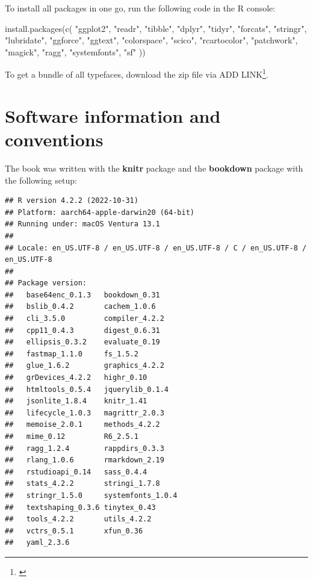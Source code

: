 \documentclass[
]{krantz}
\makeatletter
\newenvironment{Shaded}{\begin{snugshade}}{\end{snugshade}}
\newcommand{\FunctionTok}[1]{\textcolor[rgb]{0,0,0}{#1}}
\newcommand{\NormalTok}[1]{#1}
\newcommand{\StringTok}[1]{\textcolor[rgb]{0.5,0.5,0.5}{#1}}
\renewcommand{\href}[2]{#2\footnote{\url{#1}}}
\newenvironment{kframe}{%
\medskip{}
\setlength{\fboxsep}{.8em}
 \def\at@end@of@kframe{}%
 \ifinner\ifhmode%
  \def\at@end@of@kframe{\end{minipage}}%
  \begin{minipage}{\columnwidth}%
 \fi\fi%
 \def\FrameCommand##1{\hskip\@totalleftmargin \hskip-\fboxsep
 \colorbox{shadecolor}{##1}\hskip-\fboxsep
     \hskip-\linewidth \hskip-\@totalleftmargin \hskip\columnwidth}%
 \MakeFramed {\advance\hsize-\width
   \@totalleftmargin\z@ \linewidth\hsize
   \@setminipage}}%
 {\par\unskip\endMakeFramed%
 \at@end@of@kframe}
\renewenvironment{Shaded}{\begin{kframe}}{\end{kframe}}
\makeatother
\begin{document}
To install all packages in one go, run the following code in the R console:

\begin{Shaded}
\begin{Highlighting}[]
\FunctionTok{install.packages}\NormalTok{(}\FunctionTok{c}\NormalTok{(}
  \StringTok{"ggplot2"}\NormalTok{, }\StringTok{"readr"}\NormalTok{, }\StringTok{"tibble"}\NormalTok{, }\StringTok{"dplyr"}\NormalTok{, }\StringTok{"tidyr"}\NormalTok{, }\StringTok{"forcats"}\NormalTok{, }
  \StringTok{"stringr"}\NormalTok{, }\StringTok{"lubridate"}\NormalTok{, }\StringTok{"ggforce"}\NormalTok{, }\StringTok{"ggtext"}\NormalTok{, }\StringTok{"colorspace"}\NormalTok{, }\StringTok{"scico"}\NormalTok{,}
  \StringTok{"rcartocolor"}\NormalTok{, }\StringTok{"patchwork"}\NormalTok{, }\StringTok{"magick"}\NormalTok{, }\StringTok{"ragg"}\NormalTok{, }\StringTok{"systemfonts"}\NormalTok{, }\StringTok{"sf"}
\NormalTok{))}
\end{Highlighting}
\end{Shaded}

To get a bundle of all typefaces, download the zip file via \href{}{ADD LINK}.

\hypertarget{software-information-and-conventions}{%
\section*{Software information and conventions}\label{software-information-and-conventions}}


The book was written with the \textbf{knitr} package \citep{xie2015} and the \textbf{bookdown} package \citep{R-bookdown} with the following setup:

\begin{verbatim}
## R version 4.2.2 (2022-10-31)
## Platform: aarch64-apple-darwin20 (64-bit)
## Running under: macOS Ventura 13.1
## 
## Locale: en_US.UTF-8 / en_US.UTF-8 / en_US.UTF-8 / C / en_US.UTF-8 / en_US.UTF-8
## 
## Package version:
##   base64enc_0.1.3   bookdown_0.31    
##   bslib_0.4.2       cachem_1.0.6     
##   cli_3.5.0         compiler_4.2.2   
##   cpp11_0.4.3       digest_0.6.31    
##   ellipsis_0.3.2    evaluate_0.19    
##   fastmap_1.1.0     fs_1.5.2         
##   glue_1.6.2        graphics_4.2.2   
##   grDevices_4.2.2   highr_0.10       
##   htmltools_0.5.4   jquerylib_0.1.4  
##   jsonlite_1.8.4    knitr_1.41       
##   lifecycle_1.0.3   magrittr_2.0.3   
##   memoise_2.0.1     methods_4.2.2    
##   mime_0.12         R6_2.5.1         
##   ragg_1.2.4        rappdirs_0.3.3   
##   rlang_1.0.6       rmarkdown_2.19   
##   rstudioapi_0.14   sass_0.4.4       
##   stats_4.2.2       stringi_1.7.8    
##   stringr_1.5.0     systemfonts_1.0.4
##   textshaping_0.3.6 tinytex_0.43     
##   tools_4.2.2       utils_4.2.2      
##   vctrs_0.5.1       xfun_0.36        
##   yaml_2.3.6
\end{verbatim}
\end{document}
